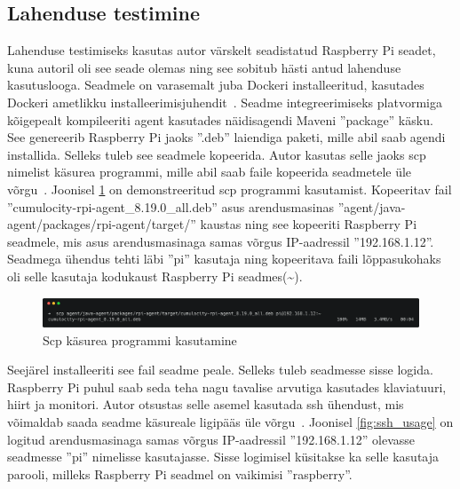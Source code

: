 \documentclass[12pt]{article}
\begin{document}
 
 
  \subsection{Lahenduse testimine}
  Lahenduse testimiseks kasutas autor värskelt seadistatud Raspberry Pi seadet, kuna autoril
  oli see seade olemas ning see sobitub hästi
  antud lahenduse kasutuslooga. Seadmele on varasemalt juba Dockeri installeeritud, kasutades
  Dockeri ametlikku installeerimisjuhendit~\cite{DockerInstallDebianGuide}.
  Seadme integreerimiseks platvormiga kõigepealt kompileeriti
  agent kasutades näidisagendi Maveni ''package'' käsku. See genereerib Raspberry Pi jaoks
  ''.deb'' laiendiga paketi, mille abil saab agendi installida. Selleks tuleb see seadmele kopeerida.
  Autor kasutas selle jaoks scp nimelist käsurea programmi, mille abil saab
  faile kopeerida seadmetele üle võrgu~\cite{scp}. Joonisel \ref{fig:scp_usage} on
  demonstreeritud scp programmi kasutamist. Kopeeritav fail ''cumulocity-rpi-agent\_8.19.0\_all.deb''
  asus arendusmasinas ''agent/java-agent/packages/rpi-agent/target/'' kaustas ning see kopeeriti Raspberry Pi
  seadmele, mis asus arendusmasinaga samas võrgus IP-aadressil ''192.168.1.12''. Seadmega ühendus
  tehti läbi ''pi'' kasutaja ning kopeeritava faili lõppasukohaks oli selle kasutaja kodukaust
  Raspberry Pi seadmes(\textasciitilde).
 
  \begin{figure} [ht] %
  \begin{center}
  \includegraphics[width=1.0\textwidth]{scp_usage}
  \caption{Scp käsurea programmi kasutamine}
  \label{fig:scp_usage}
  \end{center}
  \end{figure}
 
  \FloatBarrier
 
 
  Seejärel installeeriti see fail seadme peale. Selleks tuleb seadmesse sisse logida. Raspberry
  Pi puhul saab seda teha nagu tavalise arvutiga kasutades klaviatuuri, hiirt ja monitori. Autor otsustas
  selle asemel kasutada ssh ühendust, mis võimaldab
  saada seadme käsureale ligipääs üle võrgu~\cite{ssh}. Joonisel \ref{fig:ssh_usage} on logitud arendusmasinaga
  samas võrgus
  IP-aadressil ''192.168.1.12'' olevasse seadmesse ''pi'' nimelisse kasutajasse. Sisse logimisel
  küsitakse ka selle kasutaja parooli, milleks Raspberry Pi seadmel on vaikimisi ''raspberry''.
  
\end{document}
